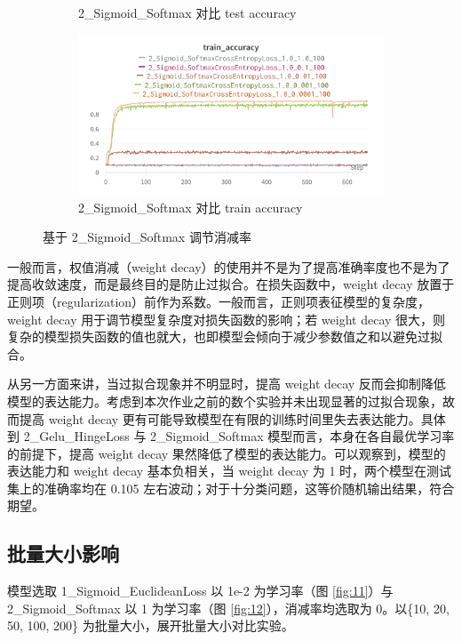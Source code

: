 \documentclass{article}
\begin{document}
\begin{figure}[htbp]
\begin{subfigure}{0.475\textwidth}
		\caption{2\_Sigmoid\_Softmax 对比 test accuracy}
	\end{subfigure}
	\begin{subfigure}{0.475\textwidth}
		\centering
		\includegraphics[width=1\textwidth]{../pics/消减率_2_Sigmoid_SoftmaxCross_train_acc.png}
		\caption{2\_Sigmoid\_Softmax 对比 train accuracy}
	\end{subfigure}
	\caption{基于 2\_Sigmoid\_Softmax 调节消减率}
	\label{fig:10}
\end{figure}

一般而言，权值消减（weight decay）的使用并不是为了提高准确率度也不是为了提高收敛速度，而是最终目的是防止过拟合。在损失函数中，weight decay 放置于正则项（regularization）前作为系数。一般而言，正则项表征模型的复杂度，weight decay 用于调节模型复杂度对损失函数的影响；若 weight decay 很大，则复杂的模型损失函数的值也就大，也即模型会倾向于减少参数值之和以避免过拟合。

从另一方面来讲，当过拟合现象并不明显时，提高 weight decay 反而会抑制降低模型的表达能力。考虑到本次作业之前的数个实验并未出现显著的过拟合现象，故而提高 weight decay 更有可能导致模型在有限的训练时间里失去表达能力。具体到 2\_Gelu\_HingeLoss 与 2\_Sigmoid\_Softmax 模型而言，本身在各自最优学习率的前提下，提高 weight decay 果然降低了模型的表达能力。可以观察到，模型的表达能力和 weight decay 基本负相关，当 weight decay 为 1 时，两个模型在测试集上的准确率均在 0.105 左右波动；对于十分类问题，这等价随机输出结果，符合期望。

\label{paragraph:1}

\subsection{批量大小影响}

模型选取 1\_Sigmoid\_EuclideanLoss 以 1e-2 为学习率（图 \ref{fig:11}）与 2\_Sigmoid\_Softmax 以 1 为学习率（图 \ref{fig:12}），消减率均选取为 0。以\{10, 20, 50, 100, 200\} 为批量大小，展开批量大小对比实验。
\end{document}
